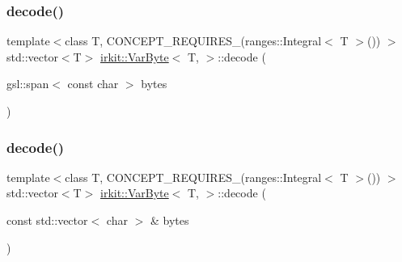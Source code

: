 \mbox{\label{structirkit_1_1VarByte_aaf5f6ea6d9d7e2e739dc15defaf89892}} 
\subsubsection{\texorpdfstring{decode()}{decode()}\hspace{0.1cm}{\footnotesize\ttfamily [1/2]}}
{\footnotesize\ttfamily template$<$class T, C\+O\+N\+C\+E\+P\+T\+\_\+\+R\+E\+Q\+U\+I\+R\+E\+S\+\_\+(ranges\+::\+Integral$<$ T $>$()) $>$ \\
std\+::vector$<$T$>$ \hyperlink{structirkit_1_1VarByte}{irkit\+::\+Var\+Byte}$<$ T, $>$\+::decode (\begin{DoxyParamCaption}\item[{gsl\+::span$<$ const char $>$}]{bytes }\end{DoxyParamCaption})\hspace{0.3cm}{\ttfamily [inline]}}

\mbox{\label{structirkit_1_1VarByte_af3b00fc21d45e56ce87ccc06626e55c5}} 
\subsubsection{\texorpdfstring{decode()}{decode()}\hspace{0.1cm}{\footnotesize\ttfamily [2/2]}}
{\footnotesize\ttfamily template$<$class T, C\+O\+N\+C\+E\+P\+T\+\_\+\+R\+E\+Q\+U\+I\+R\+E\+S\+\_\+(ranges\+::\+Integral$<$ T $>$()) $>$ \\
std\+::vector$<$T$>$ \hyperlink{structirkit_1_1VarByte}{irkit\+::\+Var\+Byte}$<$ T, $>$\+::decode (\begin{DoxyParamCaption}\item[{const std\+::vector$<$ char $>$ \&}]{bytes }\end{DoxyParamCaption})\hspace{0.3cm}{\ttfamily [inline]}}

\mbox{\label{structirkit_1_1VarByte_a4f36c3ebab2071ebd9d47f4e3e4f3a42}} 
